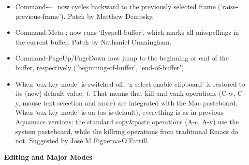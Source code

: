 \begin{itemize}
\item Command-{\textasciitilde{}} ~now cycles backward to the previously selected frame (`raise-previous-frame').
Patch by Matthew Dempsky.

\item Command-Meta-; now runs `flyspell-buffer', which marks all misspellings in the current buffer.
Patch by Nathaniel Cunningham.

\item Command-PageUp/PageDown now jump to the beginning or end of the buffer, respectively (`beginning-of-buffer', `end-of-buffer').

\item When `osx-key-mode' is switched off, `x-select-enable-clipboard' is restored to its (new) default value, \emph{t}. That means that kill and yank operations (C-w, C-y, mouse text selection and more) are integrated with the Mac pasteboard.  When `osx-key-mode' is on (as is default), everything is as in previous Aquamacs versions: the standard copy\&paste operations (A-c, A-v) use the system pasteboard, while the killring operations from traditional Emacs do not.
Suggested by José M Figueroa-O'Farrill.


\end{itemize}



\textbf{Editing and Major Modes}

